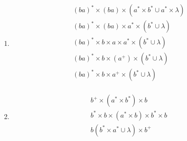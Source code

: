 \begin{question}
  
   \begin{enumerate}[label=\alph*)]
   		\item 
   		
   		\begin{align*}
   			(ba)^{*} \times (ba) \times (a^{*} \times b^{*} \cup a^{*} \times \lambda)  \\
   			(ba)^{*} \times (ba) \times a^{*} \times (b^{*} \cup \lambda)  \\
   			(ba)^{*} \times b \times a \times a^{*} \times (b^{*} \cup \lambda)  \\
   			(ba)^{*} \times b \times (a^{+}) \times (b^{*} \cup \lambda)  \\
   			(ba)^{*} \times b \times a^{+} \times (b^{*} \cup \lambda)  \\
   		\end{align*}
   		
   		\item 
   		
   	   \begin{align*}
   			b^{+} \times ( a^{*} \times b^{*} ) \times b \\
			b^{*} \times b \times ( a^{*} \times b ) \times b^{*} \times b \\
			b  ( b^{*} \times a^{*} \cup \lambda ) \times b^{+} \\
   		\end{align*}
   \end{enumerate}
\end{question}

\newpage